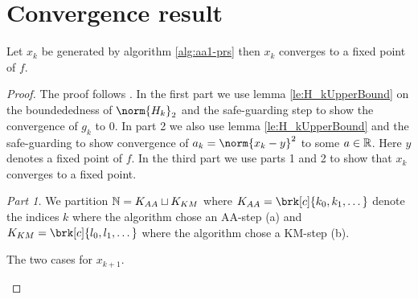 \newpage
\section{Convergence result}

\begin{theorem}[Convergence]
	Let $x_k$ be generated by algorithm \ref{alg:aa1-prs} then $x_k$ converges to a fixed point of $f$.
\end{theorem}

\begin{proof}
The proof follows \cite[Theorem 6]{ZhaAA}. In the first part we use lemma \ref{le:H_kUpperBound} on the boundededness of $\norm{H_k}_2$ and the safe-guarding step to show the convergence of $g_k$ to $0$. In part 2 we also use lemma \ref{le:H_kUpperBound} and the safe-guarding to show convergence of $a_k=\norm{x_k-y}^2$ to some $a\in\mathbb{R}$. Here $y$ denotes a fixed point of $f$. In the third part we use parts 1 and 2 to show that $x_k$ converges to a fixed point.

\textit{Part 1.}
We partition $\mathbb{N}=K_{AA}\sqcup K_{KM}$ where $K_{AA}=\brk[c]{k_0,k_1,\dots}$ denote the indices $k$ where the algorithm chose an AA-step (a) and $K_{KM}=\brk[c]{l_0,l_1,\dots}$ where the algorithm chose a KM-step (b).

\begin{center}
\begin{algorithm}[H]
\caption{The two cases for $x_{k+1}$.}
\end{algorithm}
\end{center}


\end{proof}
